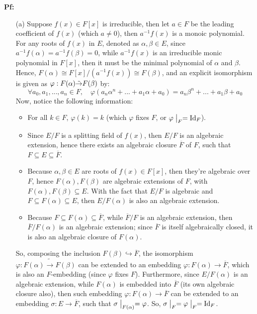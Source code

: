 \documentclass{article}
\begin{document}
\textbf{Pf:}
\begin{itemize}
    \item[(a)] Suppose $f(x)\in F[x]$ is irreducible, then let $a\in F$ be the leading coefficient of $f(x)$ (which $a\neq 0$), then $a^{-1}f(x)$ is a monoic polynomial. For any roots of $f(x)$ in $E$, denoted as $\alpha,\beta\in E$, since $a^{-1}f(\alpha)=a^{-1}f(\beta)=0$, while $a^{-1}f(x)$ is an irreducible monic polynomial in $F[x]$, then it must be the minimal polynomial of $\alpha$ and $\beta$. Hence, $F(\alpha)\cong F[x]/(a^{-1}f(x))\cong F(\beta)$, and an explicit isomorphism is given as $\varphi:F(\alpha)\Tilde{\rightarrow }F(\beta)$ by:
    $$\forall a_0,a_1,...,a_n\in F,\quad \varphi(a_n\alpha^n+...+a_1\alpha+a_0)=a_n\beta^n+...+a_1\beta+a_0$$
    Now, notice the following information:
    \begin{itemize}
        \item For all $k\in F$, $\varphi(k)=k$ (which $\varphi$ fixes $F$, or $\varphi\bigm|_{F}=\textmd{Id}_F$).
        \item Since $E/F$ is a splitting field of $f(x)$, then $E/F$ is an algebraic extension, hence there exists an algebraic closure $\overline{F}$ of $F$, such that $F\subseteq E\subseteq \overline{F}$.
        \item Because $\alpha,\beta\in E$ are roots of $f(x)\in F[x]$, then they're algebraic over $F$, hence $F(\alpha),F(\beta)$ are algebraic extensions of $F$, with $F(\alpha),F(\beta)\subseteq E$. With the fact that $E/F$ is algebraic and $F\subseteq F(\alpha)\subseteq E$, then $E/F(\alpha)$ is also an algebraic extension.
        \item Because $F\subseteq F(\alpha)\subseteq \overline{F}$, while $\overline{F}/F$ is an algebraic extension, then $\overline{F}/F(\alpha)$ is an algebraic extension; since $\overline{F}$ is itself algebraically closed, it is also an algebraic closure of $F(\alpha)$.
    \end{itemize}
    So, composing the inclusion $F(\beta)\hookrightarrow \overline{F}$, the isomorphism $\varphi:F(\alpha)\tilde{\rightarrow}F(\beta)$ can be extended to an embedding $\varphi:F(\alpha)\rightarrow \overline{F}$, which is also an $F$-embedding (since $\varphi$ fixes $F$). Furthermore, since $E/F(\alpha)$ is an algebraic extension, while $F(\alpha)$ is embedded into $\overline{F}$ (its own algebraic closure also), then such embedding $\varphi:F(\alpha)\rightarrow\overline{F}$ can be extended to an embedding $\sigma:E\rightarrow \overline{F}$, such that $\sigma\bigm|_{F(\alpha)} = \varphi$. So, $\sigma\bigm|_{F} = \varphi\bigm|_{F} = \textmd{Id}_F$.


\end{itemize}
\end{document}
